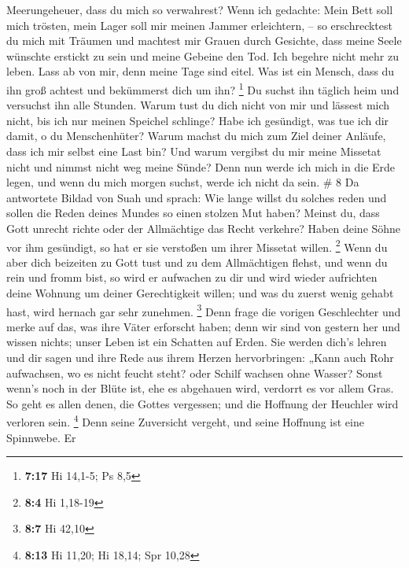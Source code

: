 Meerungeheuer, dass du mich so verwahrest?  Wenn ich
gedachte: Mein Bett soll mich trösten, mein Lager soll mir meinen Jammer
erleichtern, --  so erschrecktest du mich mit Träumen und
machtest mir Grauen durch Gesichte,  dass meine Seele
wünschte erstickt zu sein und meine Gebeine den Tod.  Ich
begehre nicht mehr zu leben. Lass ab von mir, denn meine Tage sind
eitel.  Was ist ein Mensch, dass du ihn groß achtest und
bekümmerst dich um ihn? \footnote{\textbf{7:17} Hi 14,1-5; Ps 8,5}
 Du suchst ihn täglich heim und versuchst ihn alle
Stunden.  Warum tust du dich nicht von mir und lässest
mich nicht, bis ich nur meinen Speichel schlinge?  Habe
ich gesündigt, was tue ich dir damit, o du Menschenhüter? Warum machst
du mich zum Ziel deiner Anläufe, dass ich mir selbst eine Last bin?
 Und warum vergibst du mir meine Missetat nicht und
nimmst nicht weg meine Sünde? Denn nun werde ich mich in die Erde legen,
und wenn du mich morgen suchst, werde ich nicht da sein. \# 8
 Da antwortete Bildad von Suah und sprach: 
Wie lange willst du solches reden und sollen die Reden deines Mundes so
einen stolzen Mut haben?  Meinst du, dass Gott unrecht
richte oder der Allmächtige das Recht verkehre?  Haben
deine Söhne vor ihm gesündigt, so hat er sie verstoßen um ihrer Missetat
willen. \footnote{\textbf{8:4} Hi 1,18-19}  Wenn du aber
dich beizeiten zu Gott tust und zu dem Allmächtigen flehst,
 und wenn du rein und fromm bist, so wird er aufwachen zu
dir und wird wieder aufrichten deine Wohnung um deiner Gerechtigkeit
willen;  und was du zuerst wenig gehabt hast, wird hernach
gar sehr zunehmen. \footnote{\textbf{8:7} Hi 42,10}  Denn
frage die vorigen Geschlechter und merke auf das, was ihre Väter
erforscht haben;  denn wir sind von gestern her und wissen
nichts; unser Leben ist ein Schatten auf Erden.  Sie
werden dich's lehren und dir sagen und ihre Rede aus ihrem Herzen
hervorbringen:  „Kann auch Rohr aufwachsen, wo es nicht
feucht steht? oder Schilf wachsen ohne Wasser?  Sonst
wenn's noch in der Blüte ist, ehe es abgehauen wird, verdorrt es vor
allem Gras.  So geht es allen denen, die Gottes
vergessen; und die Hoffnung der Heuchler wird verloren sein. \footnote{\textbf{8:13}
  Hi 11,20; Hi 18,14; Spr 10,28}  Denn seine Zuversicht
vergeht, und seine Hoffnung ist eine Spinnwebe.  Er
